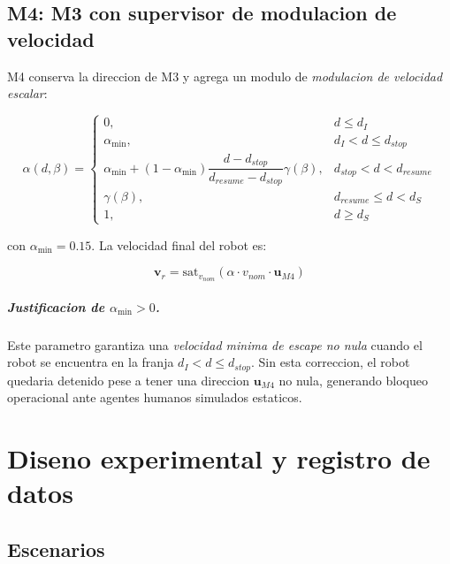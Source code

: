 \documentclass[12pt,a4paper,oneside]{book}
\begin{document}
\section{M4: M3 con supervisor de modulacion de velocidad}

M4 conserva la direccion de M3 y agrega un modulo de \emph{modulacion de velocidad escalar}:

\begin{equation}
\alpha(d,\beta) = \begin{cases}
0, & d \leq d_I \\
\alpha_{\min}, & d_I < d \leq d_{stop} \\
\alpha_{\min} + (1 - \alpha_{\min})\dfrac{d - d_{stop}}{d_{resume} - d_{stop}}\gamma(\beta), & d_{stop} < d < d_{resume} \\
\gamma(\beta), & d_{resume} \leq d < d_S \\
1, & d \geq d_S
\end{cases}
\end{equation}

con $\alpha_{\min} = 0.15$. La velocidad final del robot es:

\begin{equation}
\mathbf{v}_r = \mathrm{sat}_{v_{nom}}(\alpha \cdot v_{nom} \cdot \mathbf{u}_{M4})
\end{equation}

\paragraph{Justificacion de $\alpha_{\min} > 0$.} Este parametro garantiza una \emph{velocidad minima de escape no nula} cuando el robot se encuentra en la franja $d_I < d \leq d_{stop}$. Sin esta correccion, el robot quedaria detenido pese a tener una direccion $\mathbf{u}_{M4}$ no nula, generando bloqueo operacional ante agentes humanos simulados estaticos.

\chapter{Diseno experimental y registro de datos}
\label{chap:experimental}

\section{Escenarios}
\end{document}
